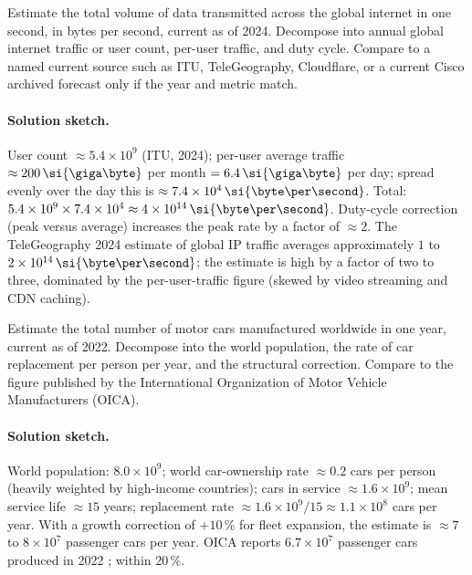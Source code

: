 \begin{exercise}
Estimate the total volume of data transmitted across the global
internet in one second, in bytes per second, current as of 2024.
Decompose into annual global internet traffic or user count,
per-user traffic, and duty cycle. Compare to a named current source
such as ITU, TeleGeography, Cloudflare, or a current Cisco archived
forecast only if the year and metric match.
\end{exercise}

\paragraph{Solution sketch.}
User count $\approx 5.4 \times 10^{9}$ (ITU, 2024); per-user
average traffic $\approx 200 \,\si{\giga\byte}$ per month $= 6.4
\,\si{\giga\byte}$ per day; spread evenly over the day this is
$\approx 7.4 \times 10^{4} \,\si{\byte\per\second}$. Total:
$5.4 \times 10^{9} \times 7.4 \times 10^{4} \approx 4 \times 10^{14}
\,\si{\byte\per\second}$. Duty-cycle correction (peak versus
average) increases the peak rate by a factor of $\approx 2$. The
TeleGeography 2024 estimate of global IP traffic averages
approximately $1$ to $2 \times 10^{14} \,\si{\byte\per\second}$;
the estimate is high by a factor of two to three, dominated by
the per-user-traffic figure (skewed by video streaming and CDN
caching).

\begin{exercise}
Estimate the total number of motor cars manufactured worldwide in
one year, current as of 2022. Decompose into the world population,
the rate of car replacement per person per year, and the structural
correction. Compare to the figure published by the International
Organization of Motor Vehicle Manufacturers (OICA).
\end{exercise}

\paragraph{Solution sketch.}
World population: $8.0 \times 10^{9}$; world car-ownership rate
$\approx 0.2$ cars per person (heavily weighted by high-income
countries); cars in service $\approx 1.6 \times 10^{9}$; mean
service life $\approx 15$ years; replacement rate $\approx
1.6 \times 10^{9} / 15 \approx 1.1 \times 10^{8}$ cars per year.
With a growth correction of $+10\,\%$ for fleet expansion, the
estimate is $\approx 7$ to $8 \times 10^{7}$ passenger cars per
year. OICA reports $6.7 \times 10^{7}$ passenger cars produced in
2022 \cite{data:ch09-oica-2023}; within $20\,\%$.

